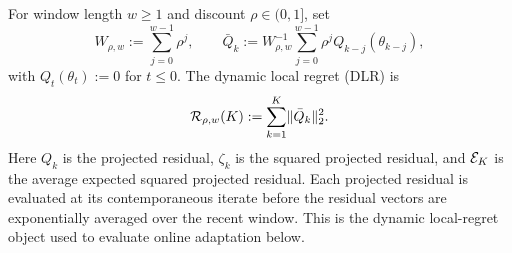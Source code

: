 For window length $w\ge1$ and discount $\rho\in(0,1]$, set
\begin{equation}\label{eq:dynamic-window-residual}
 W_{\rho,w}:=\sum_{j=0}^{w-1}\rho^j,
 \qquad
 \bar Q_k:=W_{\rho,w}^{-1}\sum_{j=0}^{w-1}\rho^j Q_{k-j}(\theta_{k-j}),
\end{equation}
with $Q_t(\theta_t):=0$ for $t\le0$.  The dynamic local regret (DLR) is
\begin{equation}\label{eq:dynamic-regret}
 \mathcal R_{\rho,w}(K):=\sum_{k=1}^{K}\lVert\bar Q_k\rVert_2^2.
\end{equation}
Here $Q_k$ is the projected residual, $\zeta_k$ is the squared projected residual, and $\mathcal E_K$ is the average expected squared projected residual.  Each projected residual is evaluated at its contemporaneous iterate before the residual vectors are exponentially averaged over the recent window.  This is the dynamic local-regret object used to evaluate online adaptation below.
